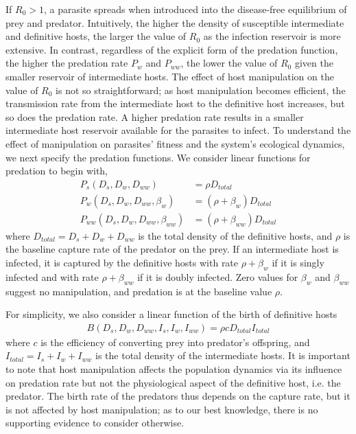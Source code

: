 \documentclass[a4paper]{scrartcl}
\begin{document}
If $R_0 > 1$, a parasite spreads when introduced into the disease-free equilibrium of prey and predator.
Intuitively, the higher the density of susceptible intermediate and definitive hosts, the larger the value of $R_0$ as the infection reservoir is more extensive. 
In contrast, regardless of the explicit form of the predation function, the higher the predation rate $P_w$ and $P_{ww}$, the lower the value of $R_0$ given the smaller reservoir of intermediate hosts. 
The effect of host manipulation on the value of $R_0$ is not so straightforward; as host manipulation becomes efficient, the transmission rate from the intermediate host to the definitive host increases, but so does the predation rate. 
A higher predation rate results in a smaller intermediate host reservoir available for the parasites to infect. 
To understand the effect of manipulation on parasites' fitness and the system's ecological dynamics, we next specify the predation functions. 
We consider linear functions for predation to begin with,
%
\begin{align*}
 P_s(D_s, D_w, D_{ww}) &= \rho D_{total}  \\
 P_w(D_s, D_w, D_{ww}, \beta_w) &= (\rho + \beta_w) D_{total} \\
 P_{ww}(D_s, D_w, D_{ww}, \beta_{ww}) &=  (\rho + \beta_{ww})D_{total}
\end{align*}
%
where $D_{total} = D_s + D_w + D_{ww}$ is the total density of the definitive hosts, and $\rho$ is the baseline capture rate of the predator on the prey. 
If an intermediate host is infected, it is captured by the definitive hosts with rate $\rho + \beta_w$ if it is singly infected and with rate $\rho + \beta_{ww}$ if it is doubly infected. 
Zero values for $\beta_w$ and $\beta_{ww}$ suggest no manipulation, and predation is at the baseline value $\rho$.

For simplicity, we also consider a linear function of the birth of definitive hosts
%
\begin{align*}
B(D_s, D_w, D_{ww}, I_s, I_w, I_{ww}) = \rho c D_{total} I_{total}
\end{align*}
%
where $c$ is the efficiency of converting prey into predator's offspring, and $I_{total} = I_s + I_w + I_{ww}$ is the total density of the intermediate hosts.
It is important to note that host manipulation affects the population dynamics via its influence on predation rate but not the physiological aspect of the definitive host, i.e. the predator.
The birth rate of the predators thus depends on the capture rate, but it is not affected by host manipulation; as to our best knowledge, there is no supporting evidence to consider otherwise.
\end{document}
